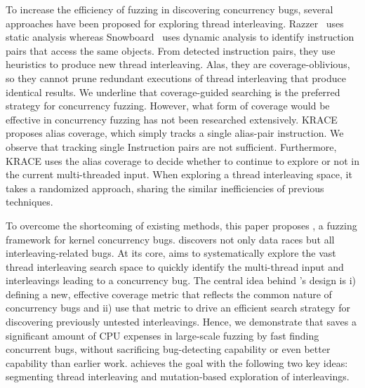 To increase the efficiency of fuzzing in discovering concurrency bugs, several approaches
have been proposed for exploring thread interleaving. 
Razzer~\cite{razzer} uses static analysis whereas
Snowboard~\cite{snowboard} uses dynamic analysis
to identify instruction pairs that access the same objects.
From detected instruction pairs, they use heuristics 
to produce new thread interleaving. Alas, they are coverage-oblivious, 
so they cannot prune redundant executions of thread interleaving
that produce identical results. We underline that 
coverage-guided searching is the preferred strategy 
for concurrency fuzzing. However, what form of coverage would be 
effective in concurrency fuzzing has not been researched extensively.
KRACE~\cite{krace} proposes alias coverage, which simply tracks 
a single alias-pair instruction. We observe that tracking single 
Instruction pairs are not sufficient. Furthermore, KRACE uses 
the alias coverage to decide whether to continue to explore or not 
in the current multi-threaded input. When exploring a thread 
interleaving space, it takes a randomized approach, 
sharing the similar inefficiencies of previous techniques.

To overcome the shortcoming of existing methods, this paper proposes
\sys, a fuzzing framework for kernel concurrency bugs. 
\sys discovers not only data races but 
all interleaving-related bugs. 
At its core, \sys aims to systematically explore the vast thread
interleaving search space to quickly identify the multi-thread input and 
interleavings leading to a concurrency bug. The central idea behind \sys's design
is i) defining a new, effective coverage metric that reflects the 
common nature of concurrency bugs and ii) use that metric to drive 
an efficient search strategy for discovering previously untested interleavings.
Hence, we demonstrate that \sys saves a significant amount of CPU expenses 
in large-scale fuzzing by fast finding concurrent bugs, 
without sacrificing bug-detecting capability or even better 
capability than earlier work.
\sys achieves the goal with the following two key ideas:
segmenting thread interleaving and mutation-based exploration of interleavings.

